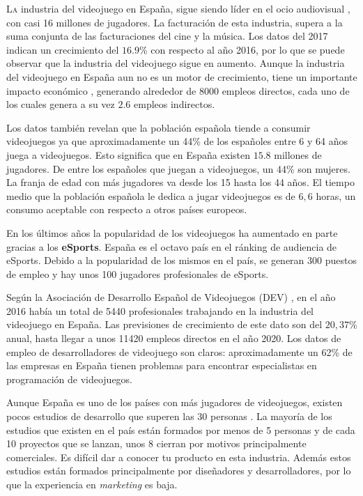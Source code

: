 \lettrine[lines=2,findent=2pt,nindent=3pt,loversize=0.1]{\textcolor[gray]{0.4}{L}}{a} industria del videojuego en España, sigue siendo líder en el ocio audiovisual \cite{1}, con casi 16 millones de jugadores. La facturación de esta industria, supera a la suma conjunta de las facturaciones del cine y la música. Los datos del 2017 indican un crecimiento del $16.9$\% con respecto al año 2016, por lo que se puede observar que la industria del videojuego sigue en aumento. Aunque la industria del videojuego en España aun no es un motor de crecimiento, tiene un importante impacto económico \cite{2}, generando alrededor de 8000 empleos directos, cada uno de los cuales genera a su vez $2.6$ empleos indirectos.

Los datos también revelan que la población española tiende a consumir videojuegos ya que aproximadamente un 44\% de los españoles entre 6 y 64 años juega a videojuegos. Esto significa que en España existen $15.8$ millones de jugadores. De entre los españoles que juegan a videojuegos, un 44\% son mujeres. La franja de edad con más jugadores va desde los 15 hasta los 44 años. El tiempo medio que la población española le dedica a jugar videojuegos es de $6,6$ horas, un consumo aceptable con respecto a otros países europeos.

En los últimos años la popularidad de los videojuegos ha aumentado en parte gracias a los \textbf{eSports}. España es el octavo país en el ránking de audiencia de eSports. Debido a la popularidad de los mismos en el país, se generan 300 puestos de empleo y hay unos 100 jugadores profesionales de eSports.

Según la Asociación de Desarrollo Español de Videojuegos (DEV) \cite{3}, en el año 2016 había un total de 5440 profesionales trabajando en la industria del videojuego en España. Las previsiones de crecimiento de este dato son del $20,37$\% anual, hasta llegar a unos 11420 empleos directos en el año 2020. Los datos de empleo de desarrolladores de videojuego son claros: aproximadamente un 62\% de las empresas en España tienen problemas para encontrar especialistas en programación de videojuegos. 

Aunque España es uno de los países con más jugadores de videojuegos, existen pocos estudios de desarrollo que superen las 30 personas \cite{4}. La mayoría de los estudios que existen en el país están formados por menos de 5 personas y de cada 10 proyectos que se lanzan, unos 8 cierran por motivos principalmente comerciales. Es difícil dar a conocer tu producto en esta industria. Además estos estudios están formados principalmente por diseñadores y desarrolladores, por lo que la experiencia en \textit{marketing} es baja.

